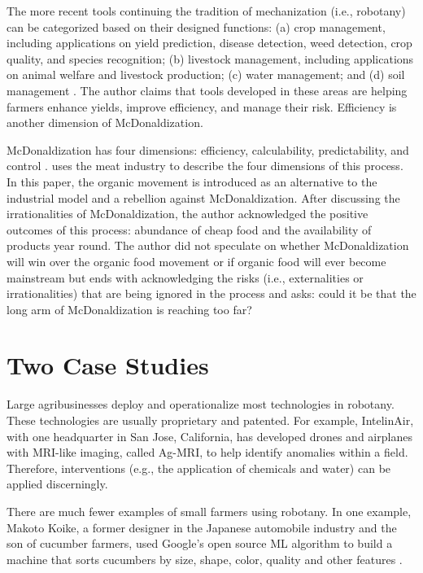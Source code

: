 The more recent tools continuing the tradition of mechanization (i.e., robotany) can be categorized based on their designed functions: (a) crop management, including applications on yield prediction, disease detection, weed detection, crop quality, and species recognition; (b) livestock management, including applications on animal welfare and livestock production; (c) water management; and (d) soil management \cite{liakos2018machine}. The author claims that tools developed in these areas are helping farmers enhance yields, improve efficiency, and manage their risk. Efficiency is another dimension of McDonaldization. 

McDonaldization has four dimensions: efficiency, calculability, predictability, and control \cite{ritzer2002introduction}.  uses the meat industry to describe the four dimensions of this process. In this paper, the organic movement is introduced as an alternative to the industrial model and a rebellion against McDonaldization. After discussing the irrationalities of McDonaldization, the author acknowledged the positive outcomes of this process: abundance of cheap food and the availability of products year round. The author did not speculate on whether McDonaldization will win over the organic food movement or if organic food will ever become mainstream but ends with acknowledging the risks (i.e., externalities or irrationalities) that are being ignored in the process and asks: could it be that the long arm of McDonaldization is reaching too far? \cite{ritzer2009mcdonaldization}

\section{Two Case Studies} 
Large agribusinesses deploy and operationalize most technologies in robotany. These technologies are usually proprietary and patented. For example, IntelinAir, with one headquarter in San Jose, California, has developed drones and airplanes with MRI-like imaging, called Ag-MRI, to help identify anomalies within a field. Therefore, interventions (e.g., the application of chemicals and water) can be applied discerningly. 

There are much fewer examples of small farmers using robotany. In one example, Makoto Koike, a former designer in the Japanese automobile industry and the son of cucumber farmers, used Google's open source ML algorithm to build a machine that sorts cucumbers by size, shape, color, quality and other features \cite{sato2017tensor}.

